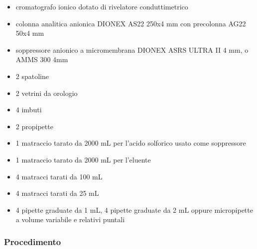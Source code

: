 \begin{itemize}
\item cromatografo ionico dotato di rivelatore conduttimetrico
\item colonna analitica anionica DIONEX AS22 250x4 mm con precolonna AG22 50x4 mm
\item soppressore anionico a micromembrana DIONEX ASRS ULTRA II 4 mm, o AMMS 300 4mm
\item 2 spatoline
\item 2 vetrini da orologio
\item 4 imbuti
\item 2 propipette
\item 1 matraccio tarato da 2000 mL per l'acido solforico usato come soppressore
\item 1 matraccio tarato da 2000 mL per l'eluente
\item 4 matracci tarati da 100 mL
\item 4 matracci tarati da 25 mL
\item 4 pipette graduate da 1 mL, 4 pipette graduate da 2 mL oppure micropipette a volume variabile e relativi puntali
\end{itemize}

\subsubsection{Procedimento}

